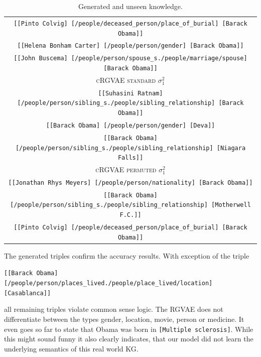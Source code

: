 \begin{table}[H]
\begin{tabular}{|c|}
  \texttt{[[Pinto Colvig]	[/people/deceased\_person/place\_of\_burial]	[Barack Obama]]}\\
  \texttt{[[Helena Bonham Carter]	[/people/person/gender]	[Barack Obama]]}\\
  \texttt{[[John Buscema]	[/people/person/spouse\_s./people/marriage/spouse]	[Barack Obama]]}\\ \hline
  \rowcolor[HTML]{EFEFEF} 
  \textsc{cRGVAE standard} $\sigma_1^2$\\ \hline
  \texttt{[[Suhasini Ratnam]	[/people/person/sibling\_s./people/sibling\_relationship]	[Barack Obama]]}\\
  \texttt{[[Barack Obama]	[/people/person/gender]	[Deva]]}\\
  \texttt{[[Barack Obama]	[/people/person/sibling\_s./people/sibling\_relationship]	[Niagara Falls]]}\\ \hline
  \rowcolor[HTML]{EFEFEF} 
  \textsc{cRGVAE permuted} $\sigma_1^2$\\ \hline
  \texttt{[[Jonathan Rhys Meyers]	[/people/person/nationality]	[Barack Obama]]}\\
  \texttt{[[Barack Obama]	[/people/person/sibling\_s./people/sibling\_relationship]	[Motherwell F.C.]]}\\
  \texttt{[[Pinto Colvig]	[/people/deceased\_person/place\_of\_burial]	[Barack Obama]]}\\ \hline
  \end{tabular}
\caption{Generated and unseen knowledge.}
\label{tab5:genTriples}
\end{table}


The generated triples confirm the accuracy results. With exception of the triple 
\begin{center}
  \texttt{[[Barack Obama]	[/people/person/places\_lived./people/place\_lived/location]	[Casablanca]]} 
\end{center}

all remaining triples violate common sense logic. The RGVAE does not differentiate between the types gender, location, movie, person or medicine. It even goes so far to state that Obama was born in \texttt{[Multiple sclerosis]}. While this might sound funny it also clearly indicates, that our model did not learn the underlying semantics of this real world KG.


